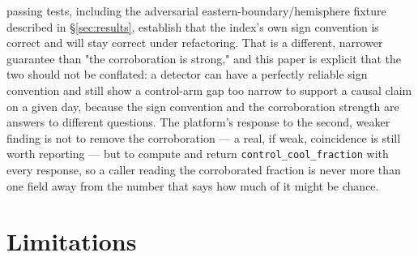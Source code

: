 \NTotalUpwellingTests{} passing tests, including the adversarial
eastern-boundary/hemisphere fixture described in \S\ref{sec:results},
establish that the index's own sign convention is correct and will stay
correct under refactoring. That is a different, narrower guarantee than "the
corroboration is strong," and this paper is explicit that the two should not
be conflated: a detector can have a perfectly reliable sign convention and
still show a control-arm gap too narrow to support a causal claim on a given
day, because the sign convention and the corroboration strength are answers
to different questions. The platform's response to the second, weaker
finding is not to remove the corroboration --- a real, if weak, coincidence
is still worth reporting --- but to compute and return \texttt{control\_cool\_fraction}
with every response, so a caller reading the corroborated fraction is never
more than one field away from the number that says how much of it might be
chance.

\section{Limitations}
\label{sec:limitations}

